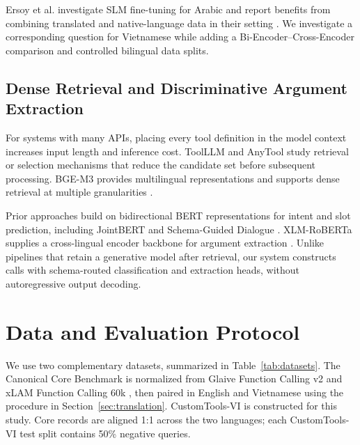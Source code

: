\documentclass[10pt,twocolumn,a4paper]{article}
\begin{document}
Ersoy et al. investigate SLM fine-tuning for Arabic and report benefits from combining translated and native-language data in their setting \cite{ersoy2025tool}. We investigate a corresponding question for Vietnamese while adding a Bi-Encoder--Cross-Encoder comparison and controlled bilingual data splits.

\subsection{Dense Retrieval and Discriminative Argument Extraction}
For systems with many APIs, placing every tool definition in the model context increases input length and inference cost. ToolLLM \cite{qin2024toolllm} and AnyTool \cite{du2024anytool} study retrieval or selection mechanisms that reduce the candidate set before subsequent processing. BGE-M3 provides multilingual representations and supports dense retrieval at multiple granularities \cite{chen2024bgem3}.

Prior approaches build on bidirectional BERT representations \cite{devlin2019bert} for intent and slot prediction, including JointBERT \cite{chen2019jointbert} and Schema-Guided Dialogue \cite{rastogi2020schema}. XLM-RoBERTa supplies a cross-lingual encoder backbone for argument extraction \cite{conneau2020xlmr}. Unlike pipelines that retain a generative model after retrieval, our system constructs calls with schema-routed classification and extraction heads, without autoregressive output decoding.

\section{Data and Evaluation Protocol}

We use two complementary datasets, summarized in Table~\ref{tab:datasets}. The Canonical Core Benchmark is normalized from Glaive Function Calling v2 \cite{glaive2023dataset} and xLAM Function Calling 60k \cite{xlam2024dataset}, then paired in English and Vietnamese using the procedure in Section~\ref{sec:translation}. CustomTools-VI is constructed for this study. Core records are aligned 1:1 across the two languages; each CustomTools-VI test split contains 50\% negative queries.
\end{document}
